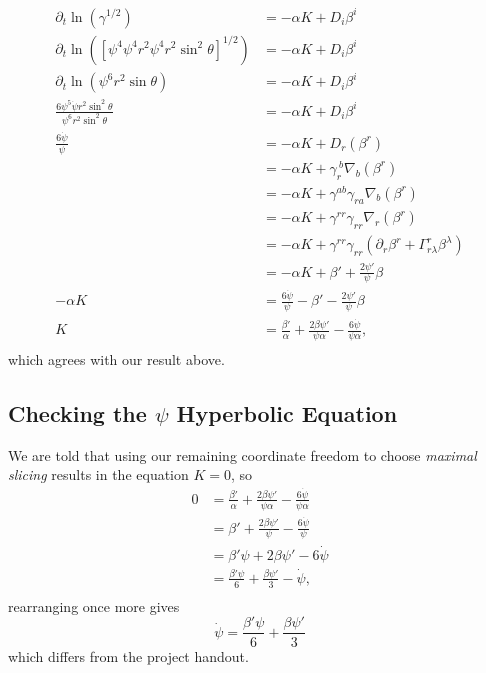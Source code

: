 \documentclass[12pt]{article}
\numberwithin{equation}{section}
\begin{document}
\begin{equation}
\begin{aligned}
\partial_t \ln(\gamma^{1/2}) &= -\alpha K + D_i \beta^i \\
\partial_t \ln( [\psi^4 \psi^4 r^2 \psi^4 r^2 \sin^2 \theta]^{1/2} ) &= -\alpha K + D_i \beta^i \\
\partial_t \ln( \psi^6 r^2 \sin \theta ) &= -\alpha K + D_i \beta^i \\
\frac{6 \psi^5 \dot{\psi} r^2 \sin^2 \theta}{\psi^6 r^2 \sin^2 \theta} &= -\alpha K + D_i \beta^i \\
\frac{6 \dot{\psi}}{\psi} &= -\alpha K + D_r (\beta^r) \\
&= -\alpha K + \gamma_r^{~b} \nabla_b (\beta^r) \\
&= -\alpha K + \gamma^{a b} \gamma_{r a} \nabla_b (\beta^r) \\
&= -\alpha K + \gamma^{r r} \gamma_{r r} \nabla_r (\beta^r) \\
&= -\alpha K + \gamma^{r r} \gamma_{r r} (\partial_r \beta^r + \Gamma_{r \lambda}^{r} \beta^\lambda) \\
&= -\alpha K + \beta' + \frac{2 \psi'}{\psi} \beta \\
-\alpha K &= \frac{6 \dot{\psi}}{\psi} - \beta' - \frac{2 \psi'}{\psi} \beta \\
K &= \frac{\beta'}{\alpha} + \frac{2 \beta \psi'}{\psi \alpha} -\frac{6 \dot{\psi}}{\psi \alpha}, \\
\end{aligned}
\end{equation}
which agrees with our result above.

\subsection{Checking the $\psi$ Hyperbolic Equation}
We are told that using our remaining coordinate freedom to choose \textit{maximal slicing} results in the equation $K = 0$, so
\begin{equation}
\begin{aligned}
0 &= \frac{\beta'}{\alpha} + \frac{2 \beta \psi'}{\psi \alpha} -\frac{6 \dot{\psi}}{\psi \alpha} \\
&= \beta' + \frac{2 \beta \psi'}{\psi} -\frac{6 \dot{\psi}}{\psi} \\
&= \beta' \psi + 2 \beta \psi' - 6 \dot{\psi} \\
&= \frac{\beta' \psi}{6} + \frac{\beta \psi'}{3} - \dot{\psi}, \\
\end{aligned}
\end{equation}
rearranging once more gives
\begin{equation}
\boxed{\dot{\psi} = \frac{\beta' \psi}{6} + \frac{\beta \psi'}{3}}
\end{equation}
which differs from the project handout.
\end{document}
